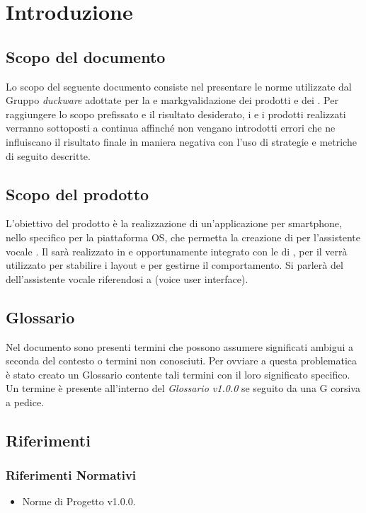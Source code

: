\clearpage
\section{Introduzione}
\subsection{Scopo del documento}
Lo scopo del seguente documento consiste nel presentare le norme utilizzate dal Gruppo \emph{duckware} adottate per la  e markg{validazione} dei prodotti e dei . Per raggiungere lo scopo prefissato e il risultato desiderato, i  e i prodotti realizzati verranno sottoposti a  continua affinché non vengano introdotti errori che ne influiscano il risultato finale in maniera negativa con l'uso di strategie e metriche di seguito descritte.
\subsection{Scopo del prodotto}
L'obiettivo del prodotto è la realizzazione di un'applicazione per smartphone, nello specifico per la piattaforma  OS, che permetta la creazione di  per l'assistente vocale  .\newline
Il  sarà realizzato in  e opportunamente integrato con le  di , per il  verrà utilizzato  per stabilire i layout e  per gestirne il comportamento. Si parlerà del  dell'assistente vocale riferendosi a  (voice user interface).
\subsection{Glossario}
Nel documento sono presenti termini che possono assumere significati ambigui a seconda del contesto o termini non conosciuti. Per ovviare a questa problematica è stato creato un Glossario contente tali termini con il loro significato specifico. Un termine è presente all'interno del \emph{Glossario v1.0.0} se seguito da una G corsiva a pedice.
\subsection{Riferimenti}
\subsubsection{Riferimenti Normativi}
\begin{itemize}
	\item Norme di Progetto v1.0.0.
\end{itemize}
